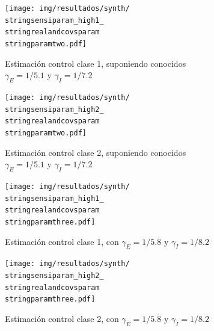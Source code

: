 \begin{figure}[H]
\centering
\begin{subfigure}[b]{0.47\textwidth}
     \centering
     \texttt{[image: img/resultados/synth/\\stringsensiparam\_high1\_\\stringrealandcovsparam\\stringparamtwo.pdf]}
     \caption{Estimación control clase 1, suponiendo conocidos \(\gamma_E = 1/5.1\) y \(\gamma_I = 1/7.2\)}
     \label{fig:legend-sensi-b-class1-gamma_real}
\end{subfigure} 
\hfill
\begin{subfigure}[b]{0.47\textwidth}
     \centering
     \texttt{[image: img/resultados/synth/\\stringsensiparam\_high2\_\\stringrealandcovsparam\\stringparamtwo.pdf]}
     \caption{Estimación control clase 2,  suponiendo conocidos \(\gamma_E = 1/5.1\) y \(\gamma_I = 1/7.2\)}
     \label{fig:legend-sensi-b-class2-gamma_real}
\end{subfigure} 
\hfill
\begin{subfigure}[b]{0.47\textwidth}
     \centering
     \texttt{[image: img/resultados/synth/\\stringsensiparam\_high1\_\\stringrealandcovsparam\\stringparamthree.pdf]}
     \caption{Estimación control clase 1,  con \(\gamma_E = 1/5.8\) y \(\gamma_I = 1/8.2\)}
     \label{fig:legend-sensi-b-class1-gamma_estimado}
\end{subfigure} 
\hfill
\begin{subfigure}[b]{0.47\textwidth}
     \centering
     \texttt{[image: img/resultados/synth/\\stringsensiparam\_high2\_\\stringrealandcovsparam\\stringparamthree.pdf]}
     \caption{Estimación control clase 2,  con \(\gamma_E = 1/5.8\) y \(\gamma_I = 1/8.2\)}
     \label{fig:legend-sensi-b-class2-gamma_estimado}
\end{subfigure} 
\hfill
\begin{subfigure}[b]{0.75\textwidth}
 \centering
{}
\end{subfigure}
\end{figure}
